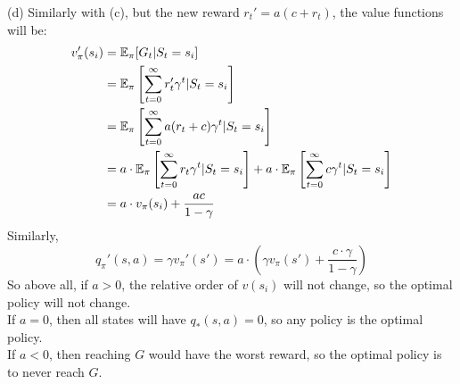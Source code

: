 \begin{homeworkProblem}
(d) Similarly with (c), but the new reward $r_t' = a(c+r_t)$, the value functions will be:
\begin{align*}
v_{\pi}'(s_i) &= \mathbb{E}_{\pi}[G_t|S_t=s_i] \\
&= \mathbb{E}_{\pi}\left[\sum_{t=0}^{\infty}r_t' \gamma^t|S_t=s_i\right] \\
&= \mathbb{E}_{\pi}\left[\sum_{t=0}^{\infty}a(r_t+c) \gamma^t|S_t=s_i\right] \\
&= a\cdot\mathbb{E}_{\pi}\left[\sum_{t=0}^{\infty}r_t \gamma^t|S_t=s_i\right] + a\cdot\mathbb{E}_{\pi}\left[\sum_{t=0}^{\infty}c \gamma^t|S_t=s_i\right] \\
& = a\cdot v_{\pi}(s_i) + \frac{ac}{1-\gamma}
\end{align*}
Similarly,
$$q_{\pi}'(s,a)=\gamma v_{\pi}'(s')=a\cdot\left(\gamma v_{\pi}(s') + \frac{c\cdot \gamma}{1-\gamma}\right)$$
So above all, if $a>0$, the relative order of $v(s_i)$ will not change, so the optimal policy will not change. \\
If $a=0$, then all states will have $q_*(s,a)=0$, so any policy is the optimal policy. \\
If $a<0$, then reaching $G$ would have the worst reward, so the optimal policy is to never reach $G$.

\end{homeworkProblem}

\newpage